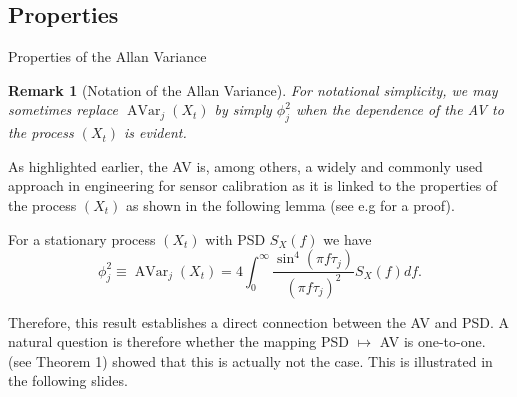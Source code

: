 \documentclass[envcountsect,usenames,dvipsnames]{beamer}
\DeclareMathOperator{\AV}{AVar}
\theoremstyle{mystyle}
\newtheorem{Remark}{Remark}
\begin{document}





\subsection{Properties}

\begin{frame}{Properties of the Allan Variance}

\footnotesize
\begin{Remark}[Notation of the Allan Variance]
For notational simplicity, we may sometimes replace $\AV_j \left(X_t \right)$ by simply $\phi_j^2$ when the dependence of the AV to the process $(X_t)$ is evident.
\end{Remark}

As highlighted earlier, the AV is, among others, a widely and commonly used approach in engineering for sensor calibration as it is linked to the properties of the process $(X_t)$ as shown in the following lemma (see e.g \cite{percival2006wavelet} for a proof).

\begin{Lemma}
\label{lemm:av:psd}
For a stationary process $(X_t)$ with PSD $S_{X}(f)$ we have
%
\begin{equation*}
\phi_j^2 \equiv \AV_j \left(X_t \right) = 4  \int_0^{\infty}  \frac{\sin^4(\pi f \tau_j)}{(\pi f \tau_j)^2} S_{X}(f) df. 
\label{eq:allanvariancePSD_LInk}
\end{equation*}
\end{Lemma}
%

Therefore, this result establishes a direct connection between the AV and PSD. A natural question is therefore whether the mapping PSD $\mapsto$ AV is one-to-one. \cite{greenhall1998spectral} (see Theorem 1) showed that this is actually not the case. This is illustrated in the following slides.
\end{frame}
\end{document}

